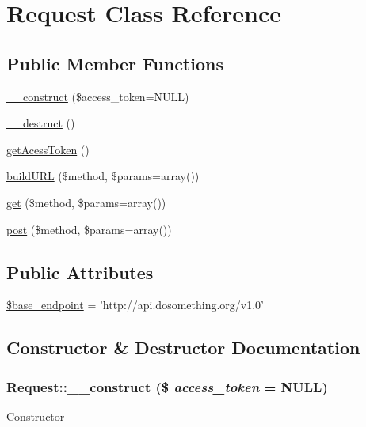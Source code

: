\hypertarget{classRequest}{
\section{Request Class Reference}
\label{classRequest}
}
\subsection*{Public Member Functions}
\begin{DoxyCompactItemize}
\item 
\hyperlink{classRequest_ad16cbe86ec6e23db410129379294d386}{\_\-\_\-construct} (\$access\_\-token=NULL)
\item 
\hyperlink{classRequest_abc025f3077005e6d01bd4619576e21ee}{\_\-\_\-destruct} ()
\item 
\hyperlink{classRequest_ab35fed0193e981da0a80fb44d5788c77}{getAcessToken} ()
\item 
\hyperlink{classRequest_ac595eebf6edfe423a31bee75bee2005e}{buildURL} (\$method, \$params=array())
\item 
\hyperlink{classRequest_a6a44d4bb9ea840bf3888f873d9c65b75}{get} (\$method, \$params=array())
\item 
\hyperlink{classRequest_aa995830096c739f724e4823ada478b96}{post} (\$method, \$params=array())
\end{DoxyCompactItemize}
\subsection*{Public Attributes}
\begin{DoxyCompactItemize}
\item 
\hyperlink{classRequest_ae5bf9331eb37302c8c46834078a79a1e}{\$base\_\-endpoint} = 'http://api.dosomething.org/v1.0'
\end{DoxyCompactItemize}


\subsection{Constructor \& Destructor Documentation}
\hypertarget{classRequest_ad16cbe86ec6e23db410129379294d386}{
\subsubsection[{\_\-\_\-construct}]{\setlength{\rightskip}{0pt plus 5cm}Request::\_\-\_\-construct (\$ {\em access\_\-token} = {\ttfamily NULL})}}
\label{classRequest_ad16cbe86ec6e23db410129379294d386}
Constructor


